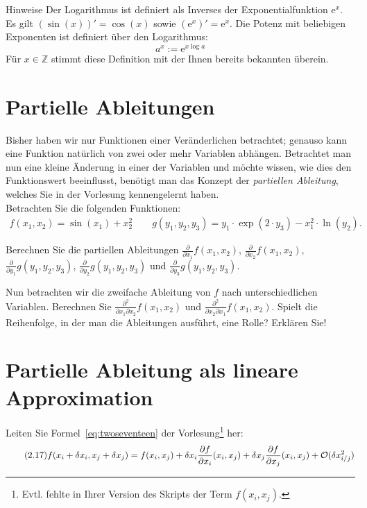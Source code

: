 \documentclass{scrartcl}
\begin{document}
\begin{remark}{Hinweise}
  Der Logarithmus ist definiert als Inverses der Exponentialfunktion $\mathrm{e}^x$.
  Es gilt $(\sin(x))' = \cos(x)$ sowie $\left( \mathrm{e}^x \right)' = \mathrm{e}^x$.
  Die Potenz mit beliebigen Exponenten ist definiert über den Logarithmus:
  \[
    a^x := \mathrm{e}^{x \log a}
  \]
  Für $x \in \mathbb{Z}$ stimmt diese Definition mit der Ihnen bereits bekannten überein. 
\end{remark}

\section{Partielle Ableitungen }
\label{sec:partielle_ableitungen}
Bisher haben wir nur Funktionen einer Veränderlichen betrachtet; genauso kann eine Funktion natürlich von zwei oder mehr Variablen abhängen. 
Betrachtet man nun eine kleine Änderung in einer der Variablen und möchte wissen, wie dies den Funktionswert beeinflusst, benötigt man das Konzept der \emph{partiellen Ableitung}, welches Sie in der Vorlesung kennengelernt haben.\\
Betrachten Sie die folgenden Funktionen:
\begin{align*}
f(x_1,x_2)=\sin(x_1)+x_2^2 \qquad g(y_1,y_2,y_3)= y_1\cdot\exp(2\cdot y_3)-x_1^2\cdot \ln(y_2).
\end{align*}

\begin{subex}
\item{} Berechnen Sie die partiellen Ableitungen $\frac{\partial}{\partial x_1}f(x_1,x_2)$, $\frac{\partial}{\partial x_2}f(x_1,x_2)$, $\frac{\partial}{\partial y_1} g(y_1,y_2,y_3)$, $\frac{\partial}{\partial y_2} g(y_1,y_2,y_3)$ und $\frac{\partial}{\partial y_3}g(y_1,y_2,y_3)$.
\item{} Nun betrachten wir die zweifache Ableitung von $f$ nach unterschiedlichen Variablen. Berechnen Sie $\frac{\partial^2}{\partial x_1\partial x_2}f(x_1,x_2)$ und $\frac{\partial^2}{\partial x_2\partial x_1}f(x_1,x_2)$.
Spielt die Reihenfolge, in der man die Ableitungen ausführt, eine Rolle?
Erklären Sie!
\end{subex}

\section{Partielle Ableitung als lineare Approximation }
\label{sec:partielle_ableitung_als_lineare_approximation}

Leiten Sie Formel~\eqref{eq:twoseventeen} der Vorlesung\footnote{%
  Evtl. fehlte in Ihrer Version des Skripts der Term $f(x_i, x_j)$.
} her:
\begin{equation}
  \tag{2.17}
  \label{eq:twoseventeen}
  f(x_i + \delta x_i, x_j + \delta x_j) = f(x_i, x_j) + \delta x_i \pderiv[f]{x_i}(x_i, x_j) + \delta x_j \pderiv[f]{x_j}(x_i, x_j) + \mathcal{O}(\delta x_{i/j}^2)
\end{equation}
\end{document}
